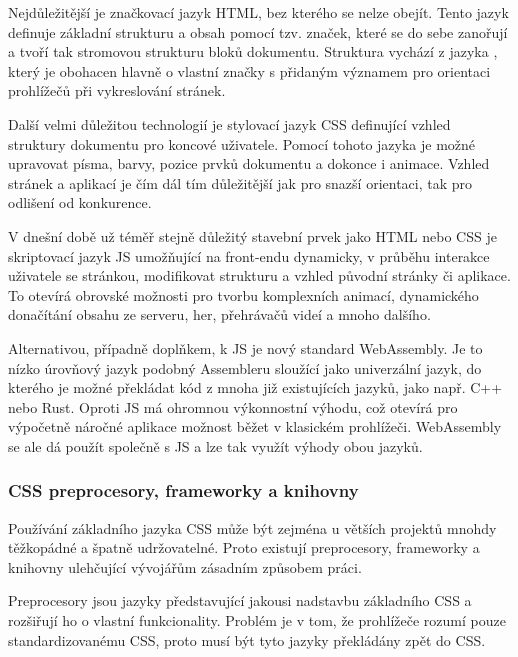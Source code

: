		Nejdůležitější je značkovací jazyk \Ac{HTML}, bez kterého se nelze obejít.
		Tento jazyk definuje základní strukturu a obsah pomocí tzv. značek, které se do sebe zanořují a
		tvoří tak stromovou strukturu bloků dokumentu.
		Struktura vychází z jazyka , který je obohacen hlavně
		o vlastní značky s přidaným významem pro orientaci prohlížečů při vykreslování stránek. \cite{html_hypertext_markup_language}

		Další velmi důležitou technologií je stylovací jazyk \Ac{CSS} definující vzhled struktury
		dokumentu pro koncové uživatele.
		Pomocí tohoto jazyka je možné upravovat písma, barvy, pozice prvků dokumentu a dokonce i animace.
		Vzhled stránek a aplikací je čím dál tím důležitější jak pro snazší orientaci, tak pro odlišení od konkurence.
		\cite{css_cascading_style_sheets}

		V dnešní době už téměř stejně důležitý stavební prvek jako \Ac{HTML} nebo \Ac{CSS} je skriptovací jazyk \ac{JS}
		umožňující na front-endu dynamicky, v průběhu interakce uživatele se stránkou, modifikovat strukturu a vzhled
		původní stránky či aplikace.
		To otevírá obrovské možnosti pro tvorbu komplexních animací, dynamického donačítání obsahu ze serveru, her, přehrávačů
		videí a mnoho dalšího. \cite{what_is_javascript}

		Alternativou, případně doplňkem, k \ac{JS} je nový standard WebAssembly.
		Je to nízko úrovňový jazyk podobný Assembleru sloužící jako univerzální jazyk, do kterého je možné překládat
		kód z mnoha již existujících jazyků, jako např. C++ nebo Rust.
		Oproti \ac{JS} má ohromnou výkonnostní výhodu, což otevírá pro výpočetně náročné aplikace možnost běžet
		v klasickém prohlížeči.
		WebAssembly se ale dá použít společně s \ac{JS} a lze tak využít výhody obou jazyků. \cite{webassembly}

		\subsubsection{CSS preprocesory, frameworky a knihovny}

		Používání základního jazyka \Ac{CSS} může být zejména u větších projektů mnohdy těžkopádné a špatně udržovatelné.
		Proto existují preprocesory, frameworky a knihovny ulehčující vývojářům zásadním způsobem práci.

		Preprocesory jsou jazyky představující jakousi nadstavbu základního \Ac{CSS} a rozšiřují ho o vlastní
		funkcionality.
		Problém je v tom, že prohlížeče rozumí pouze standardizovanému \Ac{CSS}, proto musí být tyto jazyky překládány
		zpět do \Ac{CSS}.

